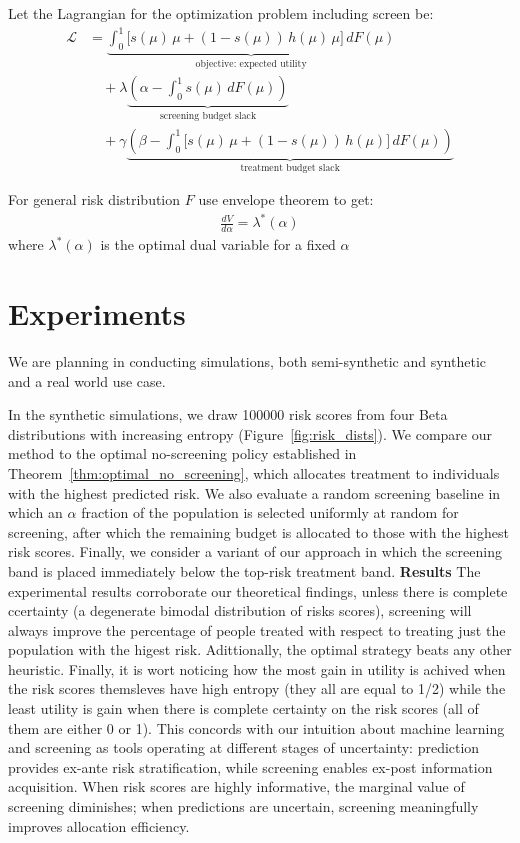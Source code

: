 \documentclass[11pt]{article}
\begin{document}
Let the Lagrangian for the optimization problem including screen be:
\begin{align}
\mathcal{L} &= \underbrace{\int_0^1 \Big[ s(\mu)\,\mu + (1 - s(\mu))\, h(\mu)\, \mu \Big]\, dF(\mu)}_{\text{objective: expected utility}} \nonumber \\[4pt]
&\quad + \lambda \underbrace{\left(\alpha - \int_0^1 s(\mu)\, dF(\mu)\right)}_{\text{screening budget slack}} \nonumber \\[4pt]
&\quad + \gamma \underbrace{\left(\beta - \int_0^1 \Big[s(\mu)\,\mu + (1-s(\mu))\,h(\mu)\Big]\, dF(\mu)\right)}_{\text{treatment budget slack}}
\end{align}


For general risk distribution $F$ use envelope theorem to get:
\begin{align}
    \frac{d V}{d \alpha} = \lambda^*(\alpha)
\end{align}
where $\lambda^*(\alpha)$ is the optimal dual variable for a fixed $\alpha$

\section{Experiments}

We are planning in conducting simulations, both semi-synthetic and synthetic and a real world use case.

In the synthetic simulations, we draw 100000 risk scores from four Beta distributions with increasing entropy (Figure~\ref{fig:risk_dists}). We compare our method to the optimal no-screening policy established in Theorem~\ref{thm:optimal_no_screening}, which allocates treatment to individuals with the highest predicted risk. We also evaluate a random screening baseline in which an $\alpha$ fraction of the population is selected uniformly at random for screening, after which the remaining budget is allocated to those with the highest risk scores. Finally, we consider a variant of our approach in which the screening band is placed immediately below the top-risk treatment band.
\textbf{Results} The experimental results corroborate our theoretical findings, unless there is complete ccertainty (a degenerate bimodal distribution of risks scores), screening will always improve the percentage of people treated with respect to treating just the population with the higest risk. Adittionally, the optimal strategy beats any other heuristic. Finally, it is wort noticing how the most gain in utility is achived when the risk scores themsleves have high entropy (they all are equal to 1/2) while the least utility is gain when there is complete certainty on the risk scores (all of them are either 0 or 1). This concords with our intuition about machine learning and screening as tools operating at different stages of uncertainty: prediction provides ex-ante risk stratification, while screening enables ex-post information acquisition. When risk scores are highly informative, the marginal value of screening diminishes; when predictions are uncertain, screening meaningfully improves allocation efficiency.
\end{document}
